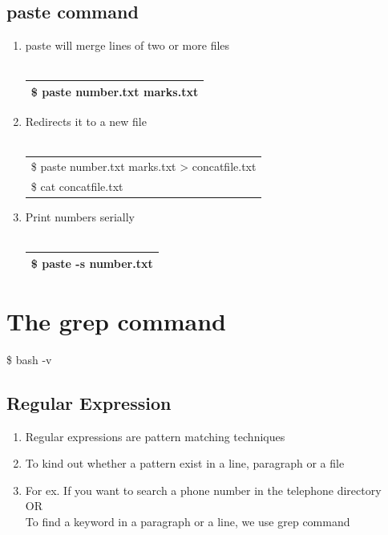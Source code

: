 \documentclass[12pt, a4paper]{report}
\begin{document}
\section{paste command}
\begin{enumerate}
\item paste will merge lines of two or more files\\
\\
\begin{tabular}{|l|}\hline
\$ paste number.txt marks.txt\\ \hline
\end{tabular}
\item Redirects it to a new file\\
\\
\begin{tabular}{|l|}\hline
\$ paste number.txt marks.txt > concatfile.txt\\
\$ cat concatfile.txt\\ \hline
\end{tabular}
\item Print numbers serially\\
\\
\begin{tabular}{|l|}\hline
\$ paste -s number.txt\\ \hline
\end{tabular}
\end{enumerate}
\chapter{The grep command}
\$ bash -v
\section{Regular Expression}
\begin{enumerate}
\item Regular expressions are pattern matching techniques
\item To kind out whether a pattern exist in a line, paragraph or a file
\item For ex. If you want to search a phone number in the telephone directory\\ 
OR\\
To find a keyword in a paragraph or a line, we use grep command
\end{enumerate}
\end{document}
